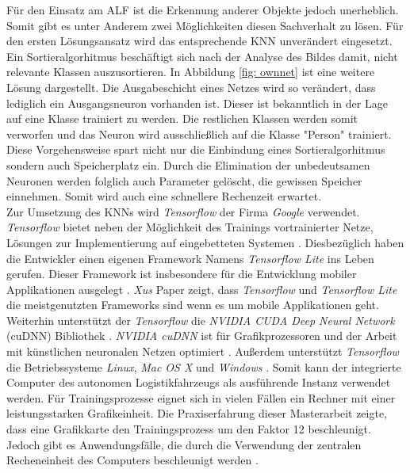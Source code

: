 		
		
		Für den Einsatz am ALF ist die Erkennung anderer Objekte jedoch unerheblich. Somit gibt es unter Anderem zwei Möglichkeiten diesen Sachverhalt zu lösen. Für den ersten Lösungsansatz wird das entsprechende KNN unverändert eingesetzt. Ein Sortieralgorhitmus beschäftigt sich nach der Analyse des Bildes damit, nicht relevante Klassen auszusortieren. In Abbildung \ref{fig: ownnet} ist eine weitere Lösung dargestellt. Die Ausgabeschicht eines Netzes wird so verändert, dass lediglich ein Ausgangsneuron vorhanden ist. Dieser ist bekanntlich in der Lage auf eine Klasse trainiert zu werden. Die restlichen Klassen werden somit verworfen und das Neuron wird ausschließlich auf die Klasse "Person" trainiert. Diese Vorgehensweise spart nicht nur die Einbindung eines Sortieralgorhitmus sondern auch Speicherplatz ein. Durch die Elimination der unbedeutsamen Neuronen werden folglich auch Parameter gelöscht, die gewissen Speicher einnehmen. Somit wird auch eine schnellere Rechenzeit erwartet. \\
		
		Zur Umsetzung des KNNs wird \textit{Tensorflow} der Firma \textit{Google} verwendet. \textit{Tensorflow} bietet neben der Möglichkeit des Trainings vortrainierter Netze, Lösungen zur Implementierung auf eingebetteten Systemen \cite{frameworks}. Diesbezüglich haben die Entwickler einen eigenen Framework Namens \textit{Tensorflow Lite} ins Leben gerufen. Dieser Framework ist insbesondere für die Entwicklung mobiler Applikationen ausgelegt \cite{tflite}. \textit{Xus} Paper zeigt, dass \textit{Tensorflow} und \textit{Tensorflow Lite} die meistgenutzten Frameworks sind wenn es um mobile Applikationen geht. Weiterhin unterstützt der \textit{Tensorflow} die \textit{NVIDIA CUDA Deep Neural Network} (cuDNN) Bibliothek \cite{frameworks}. \textit{NVIDIA cuDNN} ist für Grafikprozessoren und der Arbeit mit künstlichen neuronalen Netzen optimiert \cite{frameworks}. Außerdem unterstützt \textit{Tensorflow} die Betriebssysteme \textit{Linux}, \textit{Mac OS X} und \textit{Windows} \cite{frameworks}. Somit kann der integrierte Computer des autonomen Logistikfahrzeugs als ausführende Instanz verwendet werden. Für Trainingsprozesse eignet sich in vielen Fällen ein Rechner mit einer leistungsstarken Grafikeinheit. Die Praxiserfahrung dieser Masterarbeit zeigte, dass eine Grafikkarte den Trainingsprozess um den Faktor 12 beschleunigt. Jedoch gibt es Anwendungsfälle, die durch die Verwendung der zentralen Recheneinheit des Computers beschleunigt werden \cite{cpugpu}. \\
		
